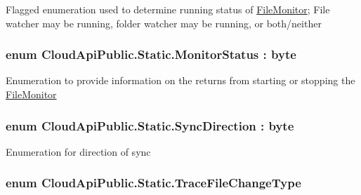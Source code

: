 Flagged enumeration used to determine running status of \hyperlink{namespace_cloud_api_public_1_1_file_monitor}{File\-Monitor}; File watcher may be running, folder watcher may be running, or both/neither 

\hypertarget{namespace_cloud_api_public_1_1_static_a31db95951688473984962a22ad05a45f}{
\subsubsection[{Monitor\-Status}]{\setlength{\rightskip}{0pt plus 5cm}enum {\bf Cloud\-Api\-Public.\-Static.\-Monitor\-Status} \-: byte}}\label{namespace_cloud_api_public_1_1_static_a31db95951688473984962a22ad05a45f}


Enumeration to provide information on the returns from starting or stopping the \hyperlink{namespace_cloud_api_public_1_1_file_monitor}{File\-Monitor} 

\hypertarget{namespace_cloud_api_public_1_1_static_a8ba5d1f6d06fa058730616f021c8974f}{
\subsubsection[{Sync\-Direction}]{\setlength{\rightskip}{0pt plus 5cm}enum {\bf Cloud\-Api\-Public.\-Static.\-Sync\-Direction} \-: byte}}\label{namespace_cloud_api_public_1_1_static_a8ba5d1f6d06fa058730616f021c8974f}


Enumeration for direction of sync 

\hypertarget{namespace_cloud_api_public_1_1_static_aadccab0d764f187bdd87a34e98676034}{
\subsubsection[{Trace\-File\-Change\-Type}]{\setlength{\rightskip}{0pt plus 5cm}enum {\bf Cloud\-Api\-Public.\-Static.\-Trace\-File\-Change\-Type}}}\label{namespace_cloud_api_public_1_1_static_aadccab0d764f187bdd87a34e98676034}




